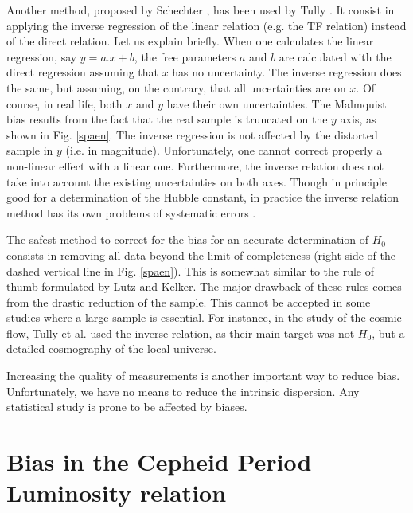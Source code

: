 Another method, proposed by Schechter \cite{schechter},  has been used by Tully \cite{invtf}. It consist in applying the inverse regression of the linear relation (e.g. the TF relation) instead of the direct relation. Let us explain briefly. When one calculates the linear regression, say $y=a.x + b$, the free parameters $a$ and $b$ are calculated with the direct regression assuming that $x$ has no uncertainty. The inverse regression does the same, but assuming, on the contrary, that all uncertainties are on $x$.  Of course, in real life, both $x$ and $y$ have their own uncertainties. The Malmquist bias results from the fact  that the real sample is truncated on the $y$ axis, as shown in Fig. \ref{spaen}. The inverse regression is not affected by the distorted sample in $y$ (i.e. in magnitude). 
Unfortunately, one cannot correct properly a non-linear effect with a linear one. Furthermore, the inverse relation does not take into account the existing uncertainties on both axes.
Though in principle good for a determination of the Hubble constant, in practice the inverse relation method has its own problems of systematic errors \cite{bias,2kind,invrel}.

 The safest method to correct for the bias for an accurate determination of $H_0$ consists in removing all data beyond the limit of completeness (right side of the dashed vertical line in Fig. \ref{spaen}). This is somewhat similar to the rule of thumb formulated  by Lutz and Kelker. The major drawback of these rules comes from the drastic reduction of the sample. This cannot be accepted in some studies where a large sample is essential. For instance, in the study of the cosmic flow, Tully et al. \cite{laniakea} used the inverse relation, as their main target was not $H_0$, but a detailed cosmography of the local universe.

Increasing the quality of measurements is another important way to reduce bias. Unfortunately, we have no means to reduce the intrinsic dispersion. Any statistical study is prone to be affected by biases.


\section{Bias in the Cepheid Period Luminosity relation }
\label{sec3}

